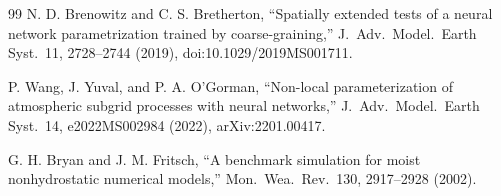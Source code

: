\documentclass[11pt]{article}
\begin{document}
\begin{thebibliography}{99}
 N. D. Brenowitz and C. S. Bretherton,
``Spatially extended tests of a neural network parametrization trained
by coarse-graining,'' J.\ Adv.\ Model.\ Earth Syst.\ 11, 2728--2744
(2019), doi:10.1029/2019MS001711.

 P. Wang, J. Yuval, and P. A. O'Gorman,
``Non-local parameterization of atmospheric subgrid processes with
neural networks,'' J.\ Adv.\ Model.\ Earth Syst.\ 14, e2022MS002984
(2022), arXiv:2201.00417.

 G. H. Bryan and J. M. Fritsch, ``A benchmark
simulation for moist nonhydrostatic numerical models,'' Mon.\ Wea.\
Rev.\ 130, 2917--2928 (2002).

\end{thebibliography}
\end{document}

